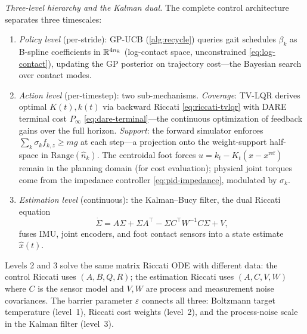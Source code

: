 \medskip\noindent\emph{Three-level hierarchy and the Kalman dual.}
The complete control architecture separates three timescales:
\begin{enumerate}[nosep]
\item \emph{Policy level} (per-stride): GP-UCB (\cref{alg:recycle})
  queries gait schedules $\beta_k$ as B-spline coefficients in
  $\mathbb{R}^{4n_k}$ (log-contact space, unconstrained
  \eqref{eq:log-contact}), updating the GP posterior on trajectory
  cost---the Bayesian search over contact modes.
\item \emph{Action level} (per-timestep): two sub-mechanisms.
  \emph{Coverage}: TV-LQR derives optimal
  $K(t), k(t)$ via backward Riccati \eqref{eq:riccati-tvlqr} with
  DARE terminal cost $P_\infty$ \eqref{eq:dare-terminal}---the
  continuous optimization of feedback gains over the full horizon.
  \emph{Support}: the forward simulator enforces
  $\sum_k \sigma_k f_{k,z} \geq mg$ at each step---a projection
  onto the weight-support half-space in $\mathrm{Range}(\hat{n}_k)$.
  The centroidal foot forces $u = k_t - K_t(x - x^{\mathrm{ref}})$
  remain in the planning domain (for cost evaluation);
  physical joint torques come from the impedance controller
  \eqref{eq:pid-impedance}, modulated by $\sigma_k$.
\item \emph{Estimation level} (continuous): the Kalman--Bucy filter,
  the dual Riccati equation
  \[
  \dot{\Sigma} = A\Sigma + \Sigma A^\top
    - \Sigma C^\top W^{-1}C\Sigma + V,
  \]
  fuses IMU, joint encoders, and foot contact sensors into a state
  estimate $\hat{x}(t)$.
\end{enumerate}
Levels 2 and 3 solve the same matrix Riccati ODE with different data:
the control Riccati uses $(A, B, Q, R)$; the estimation Riccati uses
$(A, C, V, W)$ where $C$ is the sensor model and $V, W$ are process
and measurement noise covariances.
The barrier parameter $\varepsilon$ connects all three: Boltzmann target
temperature (level~1), Riccati cost weights (level~2), and the
process-noise scale in the Kalman filter (level~3).

